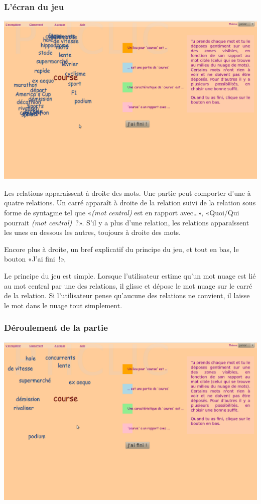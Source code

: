 \documentclass[a4paper,11pt,french]{article}
\begin{document}
\subsubsection{L'écran du jeu}
\begin{center}
\includegraphics[width=14cm]{img/PtiClicJeu.png}
\end{center}

Les relations apparaissent à droite des mots. Une partie peut comporter d'une à quatre relations. Un carré apparaît à droite de la relation suivi de la relation sous forme de syntagme tel que «\emph{(mot central)} est en rapport avec\dots{}», «Quoi/Qui pourrait \emph{(mot central)}~?». S'il y a plus d'une relation, les relations apparaîssent les unes en dessous les autres, toujours à droite des mots.

Encore plus à droite, un bref explicatif du principe du jeu, et tout en bas, le bouton «J'ai fini~!», 

Le principe du jeu est simple. Lorsque l'utilisateur estime qu'un mot nuage est lié au mot central par une des relations, il glisse et dépose le mot nuage sur le carré de la relation. Si l'utilisateur pense qu'aucune des relations ne convient, il laisse le mot dans le nuage tout simplement. 

\subsubsection{Déroulement de la partie}
\begin{center}
\includegraphics[width=14cm]{img/PtiClicJeu2.png}
\end{center}
\end{document}
